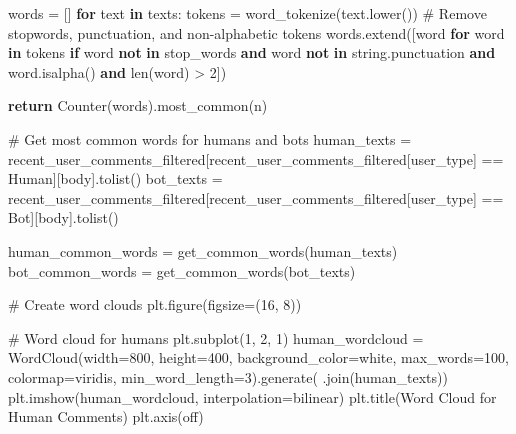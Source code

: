 \documentclass[
  12pt,
  letterpaper,
  DIV=11,
  numbers=noendperiod]{scrartcl}
\newenvironment{Shaded}{\begin{snugshade}}{\end{snugshade}}
\newcommand{\BuiltInTok}[1]{\textcolor[rgb]{0.00,0.23,0.31}{#1}}
\newcommand{\CommentTok}[1]{\textcolor[rgb]{0.37,0.37,0.37}{#1}}
\newcommand{\ControlFlowTok}[1]{\textcolor[rgb]{0.00,0.23,0.31}{\textbf{#1}}}
\newcommand{\DecValTok}[1]{\textcolor[rgb]{0.68,0.00,0.00}{#1}}
\newcommand{\KeywordTok}[1]{\textcolor[rgb]{0.00,0.23,0.31}{\textbf{#1}}}
\newcommand{\NormalTok}[1]{\textcolor[rgb]{0.00,0.23,0.31}{#1}}
\newcommand{\OperatorTok}[1]{\textcolor[rgb]{0.37,0.37,0.37}{#1}}
\newcommand{\StringTok}[1]{\textcolor[rgb]{0.13,0.47,0.30}{#1}}
\begin{document}
\begin{Shaded}
\begin{Highlighting}[]
\NormalTok{    words }\OperatorTok{=}\NormalTok{ []}
    \ControlFlowTok{for}\NormalTok{ text }\KeywordTok{in}\NormalTok{ texts:}
\NormalTok{        tokens }\OperatorTok{=}\NormalTok{ word\_tokenize(text.lower())}
        \CommentTok{\# Remove stopwords, punctuation, and non{-}alphabetic tokens}
\NormalTok{        words.extend([word }\ControlFlowTok{for}\NormalTok{ word }\KeywordTok{in}\NormalTok{ tokens }\ControlFlowTok{if}\NormalTok{ word }\KeywordTok{not} \KeywordTok{in}\NormalTok{ stop\_words }
                     \KeywordTok{and}\NormalTok{ word }\KeywordTok{not} \KeywordTok{in}\NormalTok{ string.punctuation }
                     \KeywordTok{and}\NormalTok{ word.isalpha() }
                     \KeywordTok{and} \BuiltInTok{len}\NormalTok{(word) }\OperatorTok{\textgreater{}} \DecValTok{2}\NormalTok{])}
    
    \ControlFlowTok{return}\NormalTok{ Counter(words).most\_common(n)}

\CommentTok{\# Get most common words for humans and bots}
\NormalTok{human\_texts }\OperatorTok{=}\NormalTok{ recent\_user\_comments\_filtered[recent\_user\_comments\_filtered[}\StringTok{\textquotesingle{}user\_type\textquotesingle{}}\NormalTok{] }\OperatorTok{==} \StringTok{\textquotesingle{}Human\textquotesingle{}}\NormalTok{][}\StringTok{\textquotesingle{}body\textquotesingle{}}\NormalTok{].tolist()}
\NormalTok{bot\_texts }\OperatorTok{=}\NormalTok{ recent\_user\_comments\_filtered[recent\_user\_comments\_filtered[}\StringTok{\textquotesingle{}user\_type\textquotesingle{}}\NormalTok{] }\OperatorTok{==} \StringTok{\textquotesingle{}Bot\textquotesingle{}}\NormalTok{][}\StringTok{\textquotesingle{}body\textquotesingle{}}\NormalTok{].tolist()}

\NormalTok{human\_common\_words }\OperatorTok{=}\NormalTok{ get\_common\_words(human\_texts)}
\NormalTok{bot\_common\_words }\OperatorTok{=}\NormalTok{ get\_common\_words(bot\_texts)}

\CommentTok{\# Create word clouds}
\NormalTok{plt.figure(figsize}\OperatorTok{=}\NormalTok{(}\DecValTok{16}\NormalTok{, }\DecValTok{8}\NormalTok{))}

\CommentTok{\# Word cloud for humans}
\NormalTok{plt.subplot(}\DecValTok{1}\NormalTok{, }\DecValTok{2}\NormalTok{, }\DecValTok{1}\NormalTok{)}
\NormalTok{human\_wordcloud }\OperatorTok{=}\NormalTok{ WordCloud(width}\OperatorTok{=}\DecValTok{800}\NormalTok{, height}\OperatorTok{=}\DecValTok{400}\NormalTok{, background\_color}\OperatorTok{=}\StringTok{\textquotesingle{}white\textquotesingle{}}\NormalTok{, }
\NormalTok{                           max\_words}\OperatorTok{=}\DecValTok{100}\NormalTok{, colormap}\OperatorTok{=}\StringTok{\textquotesingle{}viridis\textquotesingle{}}\NormalTok{, min\_word\_length}\OperatorTok{=}\DecValTok{3}\NormalTok{).generate(}\StringTok{\textquotesingle{} \textquotesingle{}}\NormalTok{.join(human\_texts))}
\NormalTok{plt.imshow(human\_wordcloud, interpolation}\OperatorTok{=}\StringTok{\textquotesingle{}bilinear\textquotesingle{}}\NormalTok{)}
\NormalTok{plt.title(}\StringTok{\textquotesingle{}Word Cloud for Human Comments\textquotesingle{}}\NormalTok{)}
\NormalTok{plt.axis(}\StringTok{\textquotesingle{}off\textquotesingle{}}\NormalTok{)}


\end{Highlighting}
\end{Shaded}
\end{document}
